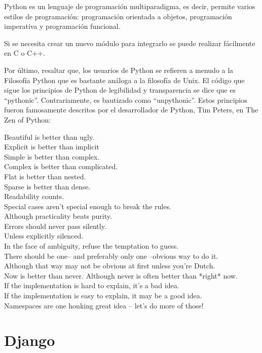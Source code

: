 Python es un lenguaje de programación multiparadigma, es decir, permite varios estilos de programación: programación orientada a objetos, programación imperativa y programación funcional. 


Si se necesita crear un nuevo módulo para integrarlo se puede realizar fácilmente en C o C++.


Por último, resaltar que, los usuarios de Python se refieren a menudo a la Filosofía Python que es bastante análoga a la filosofía de Unix. El código que sigue los principios de Python de legibilidad y transparencia se dice que es “pythonic”. Contrariamente, es bautizado como “unpythonic”. Estos principios fueron famosamente descritos por el desarrollador de Python, Tim Peters, en The Zen of Python:


Beautiful is better than ugly. \\
Explicit is better than implicit\\
Simple is better than complex. \\
Complex is better than complicated. \\
Flat is better than nested. \\
Sparse is better than dense. \\
Readability counts. \\
Special cases aren’t special enough to break the rules. \\
Although practicality beats purity. \\
Errors should never pass silently. \\
Unless explicitly silenced. \\
In the face of ambiguity, refuse the temptation to guess. \\
There should be one– and preferably only one –obvious way to do it. \\
Although that way may not be obvious at first unless you’re Dutch. \\
Now is better than never. Although never is often better than *right* now. \\
If the implementation is hard to explain, it’s a bad idea. \\
If the implementation is easy to explain, it may be a good idea. \\
Namespaces are one honking great idea – let’s do more of those!



\section{Django} 
\label{sec:django}


